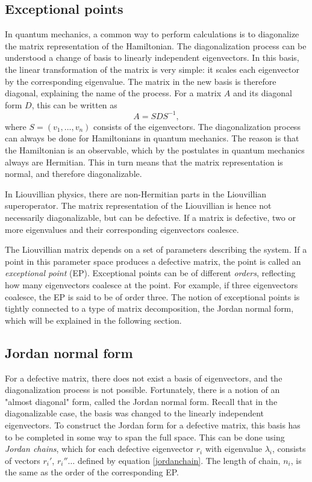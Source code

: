 \documentclass[../main.tex]{subfiles}
\begin{document}
\subsection{Exceptional points}\label{sec: ep}
In quantum mechanics, a common way to perform calculations is to diagonalize the matrix representation of the Hamiltonian. The diagonalization process can be understood a change of basis to linearly independent eigenvectors. In this basis, the linear transformation of the matrix is very simple: it scales each eigenvector by the corresponding eigenvalue. The matrix in the new basis is therefore diagonal, explaining the name of the process. For a matrix $A$ and its diagonal form $D$, this can be written as 
\begin{equation}
    A = SDS^{-1},
\end{equation}
where $S = (v_1, \dots ,v_n)$ consists of the eigenvectors. The diagonalization process can always be done for Hamiltonians in quantum mechanics. The reason is that the Hamiltonian is an observable, which by the postulates in quantum mechanics always are Hermitian. This in turn means that the matrix representation is normal, and therefore diagonalizable.

In Liouvillian physics, there are non-Hermitian parts in the Liouvillian superoperator. The matrix representation of the Liouvillian is hence not necessarily diagonalizable, but can be defective. If a matrix is defective, two or more eigenvalues and their corresponding eigenvectors coalesce.

The Liouvillian matrix depends on a set of parameters describing the system. If a point in this parameter space produces a defective matrix, the point is called an \textit{exceptional point} (EP). Exceptional points can be of different \textit{orders}, reflecting how many eigenvectors coalesce at the point. For example, if three eigenvectors coalesce, the EP is said to be of order three. The notion of exceptional points is tightly connected to a type of matrix decomposition, the Jordan normal form, which will be explained in the following section.

\subsection{Jordan normal form}

For a defective matrix, there does not exist a basis of eigenvectors, and the diagonalization process is not possible. Fortunately, there is a notion of an "almost diagonal" form, called the Jordan normal form. Recall that in the diagonalizable case, the basis was changed to the linearly independent eigenvectors. To construct the Jordan form for a defective matrix, this basis has to be completed in some way to span the full space. This can be done using \textit{Jordan chains}, which for each defective eigenvector $r_i$ with eigenvalue $\lambda_i$, consists of vectors $r_i'$, $r_i'' \dots$ defined by equation \ref{jordanchain}. The length of chain, $n_i$, is the same as the order of the corresponding EP.
\end{document}
